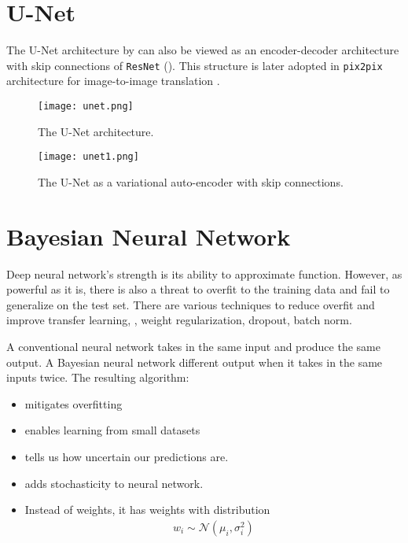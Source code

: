 \section{U-Net}
The U-Net architecture by  can also be viewed as an encoder-decoder architecture \cite{kingma2013auto} with skip connections of \texttt{ResNet} (). This structure is later adopted in \texttt{pix2pix} architecture for image-to-image translation \cite{isola2017image}.
\begin{figure}[hbt!]
	\centering
	\texttt{[image: unet.png]}
	\caption{The U-Net architecture. \cite{ronneberger2015u}}
\end{figure}
\begin{figure}[hbt!]
	\centering
	\texttt{[image: unet1.png]}
	\caption{The U-Net as a variational auto-encoder with skip connections. \cite{isola2017image}}
	\label{fig:unet1}
\end{figure}


\section{Bayesian Neural Network}
Deep neural network's strength is its ability to approximate function. However, as powerful as it is, there is also a threat to overfit to the training data and fail to generalize on the test set. There are various techniques to reduce overfit and improve transfer learning, \eg, weight regularization, dropout, batch norm.

A conventional neural network takes in the same input and produce the same output. A Bayesian neural network different output when it takes in the same inputs twice. The resulting algorithm:
\begin{itemize}
	\item mitigates overfitting
	\item enables learning from small datasets
	\item tells us how uncertain our predictions are.
	\item adds stochasticity to neural network.
	\item Instead of weights, it has weights with distribution
	\begin{align}
		w_i \sim \mathcal{N}(\mu_i, \sigma_i^2)
	\end{align}
\end{itemize}

